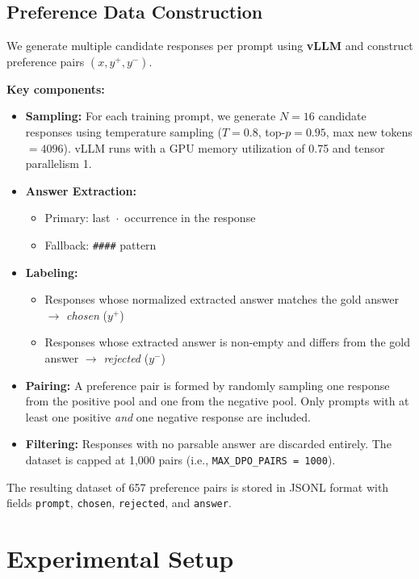 \documentclass{article}
\begin{document}
\subsection{Preference Data Construction}

We generate multiple candidate responses per prompt using \textbf{vLLM} and construct preference pairs $(x, y^+, y^-)$.

\textbf{Key components:}

\begin{itemize}
    \item \textbf{Sampling:} For each training prompt, we generate $N = 16$ candidate responses using temperature sampling ($T = 0.8$, top-$p = 0.95$, max new tokens $= 4096$). vLLM runs with a GPU memory utilization of 0.75 and tensor parallelism 1.
    \item \textbf{Answer Extraction:}
    \begin{itemize}
        \item Primary: last $\boxed{\cdot}$ occurrence in the response
        \item Fallback: \texttt{\#\#\#\#} pattern
    \end{itemize}
    \item \textbf{Labeling:}
    \begin{itemize}
        \item Responses whose normalized extracted answer matches the gold answer $\rightarrow$ \textit{chosen} ($y^+$)
        \item Responses whose extracted answer is non-empty and differs from the gold answer $\rightarrow$ \textit{rejected} ($y^-$)
    \end{itemize}
    \item \textbf{Pairing:} A preference pair is formed by randomly sampling one response from the positive pool and one from the negative pool. Only prompts with at least one positive \emph{and} one negative response are included.
    \item \textbf{Filtering:} Responses with no parsable answer are discarded entirely. The dataset is capped at 1{,}000 pairs (i.e., \texttt{MAX\_DPO\_PAIRS = 1000}).
\end{itemize}

The resulting dataset of 657 preference pairs is stored in JSONL format with fields \texttt{prompt}, \texttt{chosen}, \texttt{rejected}, and \texttt{answer}.

\section{Experimental Setup}
\end{document}
